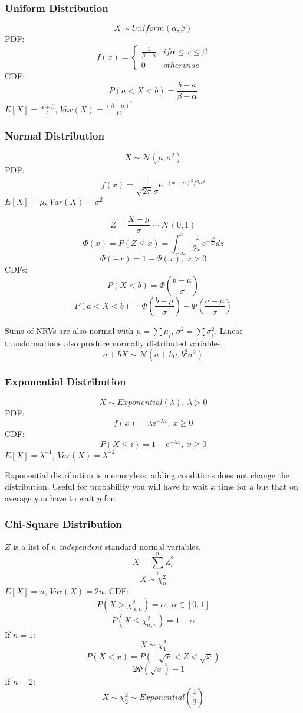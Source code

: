 \subsubsection{Uniform Distribution}
$$X\sim Uniform(\alpha, \beta)$$
PDF:
\begin{equation*}
  f(x) =
\begin{cases*}
  \frac{1}{\beta-\alpha} & if \alpha \leq x \leq \beta\\
  0 & otherwise
\end{cases*}
\end{equation*}
CDF:
$$P(a < X < b) = \frac{b-a}{\beta-\alpha}$$
$E[X] = \frac{\alpha + \beta}{2}$, $Var(X) = \frac{(\beta-\alpha)^2}{12}$

\subsubsection{Normal Distribution}
$$X\sim \mathcal{N}(\mu, \sigma^2)$$
PDF:
$$f(x) = \frac{1}{\sqrt{2\pi}\sigma}\mathrm{e}^{-(x-\mu)^2/2\sigma^2}$$
$E[X] = \mu$, $Var(X) = \sigma^2$

$$Z=\frac{X-\mu}{\sigma} \sim \mathcal{N}(0, 1)$$
$$\Phi(x) = P(Z\leq x) = \int_{-\infty}^x \frac{1}{2\pi} \mathrm{e}^{-\frac{z^2}{2}} dz$$
$$\Phi(-x) = 1-\Phi(x),\ x > 0$$
CDFs:
$$P(X < b) = \Phi\left(\frac{b-\mu}{\sigma}\right)$$
$$P(a < X < b) = \Phi\left(\frac{b-\mu}{\sigma}\right) - \Phi\left(\frac{a-\mu}{\sigma}\right)$$

Sums of NRVs are also normal with $\mu = \sum \mu_i$, $\sigma^2 = \sum \sigma^2_i$.
Linear transformations also produce normally distributed variables.
$$a+bX \sim \mathcal{N}(a+b\mu, b^2\sigma^2)$$

\subsubsection{Exponential Distribution}
$$X\sim Exponential(\lambda),\ \lambda > 0$$
PDF:
$$f(x) = \lambda \mathrm{e}^{-\lambda x},\ x \geq 0$$
CDF:
$$P(X \leq i) = 1-\mathrm{e}^{-\lambda x},\ x \geq 0$$
$E[X] = \lambda^{-1}$, $Var(X) = \lambda^{-2}$

Exponential distribution is memoryless, adding conditions does not change the distribution.
Useful for probability you will have to wait $x$ time for a bus that on average you have to wait $y$ for.

\subsubsection{Chi-Square Distribution}
$Z$ is a list of $n$ \textit{independent} standard normal variables.
$$X=\sum_i^n Z_i^2$$
$$X\sim \chi_n^2$$
$E[X] = n$, $Var(X) = 2n$.
CDF:
$$P(X > \chi_{\alpha,n}^2) = \alpha,\ \alpha\in [0,1]$$
$$P(X \leq \chi_{\alpha,n}^2) = 1-\alpha$$
If $n=1$:
$$X\sim \chi_1^2$$
$$P(X<x) = P(-\sqrt{x} < Z < \sqrt{x})$$
$$=2\Phi(\sqrt{x})-1$$
If $n=2$:
$$X\sim \chi_2^2 \sim Exponential\left(\frac{1}{2}\right)$$
